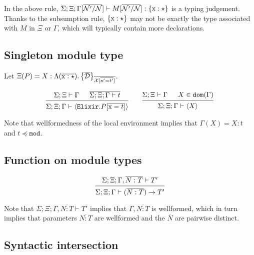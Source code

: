 \documentclass[12pt]{article}
\newcommand{\tx}{\text{\rm x}}
\newcommand{\BX}{\ensuremath{\mathcal{X}}}
\newcommand{\Next}{\ensuremath{\mathcal{N}}}
\newcommand{\Gammatop}{\ensuremath{\Xi}}
\newcommand{\Gammabot}{\ensuremath{\Gamma}}
\newcommand{\dom}{\texttt{dom}}
\renewcommand{\mod}{\texttt{mod}}
\newcommand{\Elixir}{\texttt{Elixir}}
\begin{document}
In the above rule, $\Sigma; \Gammatop; \Gammabot[\overline{\Next'/\Next}] \vdash M[\overline{\Next'/\Next}] : \{ \tx : \star \} $ is a typing judgement.
Thanks to the subsumption rule, $\{ \tx : \star \}$ may not be exactly the type associated with $M$ in $\Gammatop$ or $\Gammabot$,
which will typically contain more declarations.

\subsection{Singleton module type}

Let $\Gammatop(P) = X : \Moddecl[\tx] [\overline{\mathcal{D}}][\BX][\tx'][t']$.

\[
    \begin{prooftree}
        \hypo { \Sigma; \Gammatop \vdash \Gammabot }
        \hypo { \overline{\Sigma; \Gammatop; \Gammabot \vdash t} }
        \infer2{ \Sigma; \Gammatop; \Gammabot \vdash \langle \Elixir.P[\overline{\tx = t}] \rangle }
    \end{prooftree}
    \qquad
    \begin{prooftree}
        \hypo { \Sigma; \Gammatop \vdash \Gammabot }
        \hypo { X \in \dom(\Gammabot) }
        \infer2{ \Sigma; \Gammatop; \Gammabot \vdash \langle X \rangle }
    \end{prooftree}
\]

Note that wellformedness of the local environment implies that
$\Gammabot(X) = X : t$ and $t \preceq \mod$.

\subsection{Function on module types}

\[
    \begin{prooftree}
        \hypo { \Sigma; \Gammatop; \Gammabot, \overline{N : T} \vdash  T' }
        \infer1{ \Sigma; \Gammatop; \Gammabot  \vdash (\overline{N : T}) \rightarrow T' }
    \end{prooftree}
\]

Note that $\Sigma; \Gammatop; \Gammabot, \overline{N : T} \vdash  T'$
implies that $\Gammabot, \overline{N : T}$ is wellformed, which in turn implies
that parameters $\overline{N : T}$ are wellformed and the $\overline{N}$ are pairwise distinct.

\subsection{Syntactic intersection}
\end{document}
